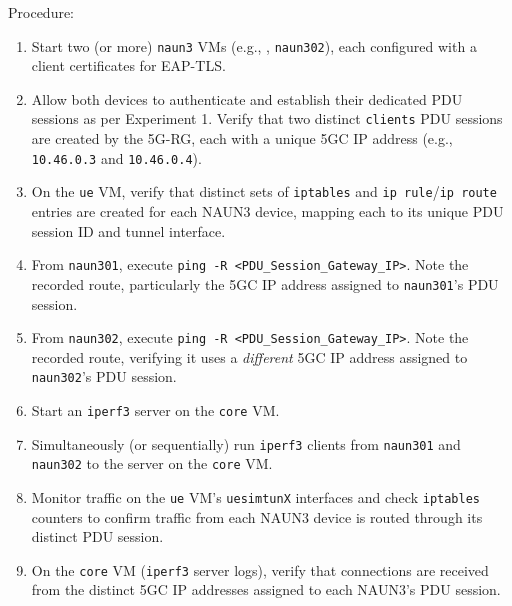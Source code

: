 Procedure:
\begin{enumerate}
    \item Start two (or more) \texttt{naun3} \acp{VM} (e.g., , \texttt{naun302}), each configured with a client certificates for \ac{EAP-TLS}.

    \item Allow both devices to authenticate and establish their dedicated \ac{PDU} sessions as per Experiment 1. Verify that two distinct \texttt{clients} \ac{PDU} sessions are created by the \ac{5G-RG}, each with a unique \ac{5GC} \ac{IP} address (e.g., \texttt{10.46.0.3} and \texttt{10.46.0.4}).
    
    \item On the \texttt{ue} \ac{VM}, verify that distinct sets of \texttt{iptables} and \texttt{ip rule}/\texttt{ip route} entries are created for each \ac{NAUN3} device, mapping each to its unique \ac{PDU} session ID and tunnel interface.
    
    \item From \texttt{naun301}, execute \texttt{ping -R <PDU\_Session\_Gateway\_IP>}. Note the recorded route, particularly the \ac{5GC} \ac{IP} address assigned to \texttt{naun301}'s \ac{PDU} session.
    
    \item From \texttt{naun302}, execute \texttt{ping -R <PDU\_Session\_Gateway\_IP>}. Note the recorded route, verifying it uses a \textit{different} \ac{5GC} \ac{IP} address assigned to \texttt{naun302}'s \ac{PDU} session.
    
    \item Start an \texttt{iperf3} server on the \texttt{core} \ac{VM}.
    
    \item Simultaneously (or sequentially) run \texttt{iperf3} clients from \texttt{naun301} and \texttt{naun302} to the server on the \texttt{core} \ac{VM}.
    
    \item Monitor traffic on the \texttt{ue} \ac{VM}'s \texttt{uesimtunX} interfaces and check \texttt{iptables} counters to confirm traffic from each \ac{NAUN3} device is routed through its distinct \ac{PDU} session.
    
    \item On the \texttt{core} \ac{VM} (\texttt{iperf3} server logs), verify that connections are received from the distinct \ac{5GC} \ac{IP} addresses assigned to each \ac{NAUN3}'s \ac{PDU} session.
\end{enumerate}

